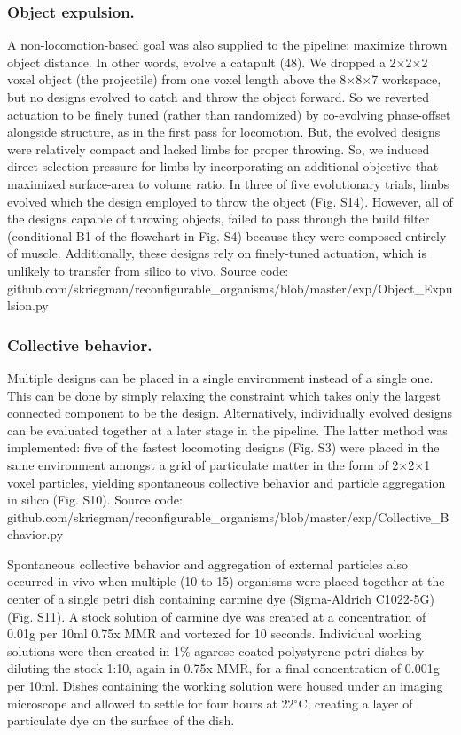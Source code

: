 \subsubsection*{Object expulsion.}

A non-locomotion-based goal was also supplied to the pipeline: maximize thrown object distance. In other words, evolve a catapult (48). We dropped a 2{$\times$}2{$\times$}2 voxel object (the projectile) from one voxel length above the 8{$\times$}8{$\times$}7 workspace, but no designs evolved to catch and throw the object forward. So we reverted actuation to be finely tuned (rather than randomized) by co-evolving phase-offset alongside structure, as in the first pass for locomotion. But, the evolved designs were relatively compact and lacked limbs for proper throwing. So, we induced direct selection pressure for limbs by incorporating an additional objective that maximized surface-area to volume ratio. In three of five evolutionary trials, limbs evolved which the design employed to throw the object (Fig. S14). However, all of the designs capable of throwing objects, failed to pass through the build filter (conditional B1 of the flowchart in Fig. S4) because they were composed entirely of muscle. Additionally, these designs rely on finely-tuned actuation, which is unlikely to transfer from silico to vivo. Source code: github.com/skriegman/reconfigurable\_organisms/blob/master/exp/Object\_Expulsion.py

\subsubsection*{Collective behavior.}

Multiple designs can be placed in a single environment instead of a single one. This can be done by simply relaxing the constraint which takes only the largest connected component to be the design. Alternatively, individually evolved designs can be evaluated together at a later stage in the pipeline. The latter method was implemented: five of the fastest locomoting designs (Fig. S3) were placed in the same environment amongst a grid of particulate matter in the form of 2{$\times$}2{$\times$}1 voxel particles, yielding spontaneous collective behavior and particle aggregation in silico (Fig. S10). Source code: github.com/skriegman/reconfigurable\_organisms/blob/master/exp/Collective\_Behavior.py

Spontaneous collective behavior and aggregation of external particles also occurred in vivo when multiple (10 to 15) organisms were placed together at the center of a single petri dish containing carmine dye (Sigma-Aldrich C1022-5G) (Fig. S11). A stock solution of carmine dye was created at a concentration of 0.01g per 10ml 0.75x MMR and vortexed for 10 seconds. Individual working solutions were then created in 1\% agarose coated polystyrene petri dishes by diluting the stock 1:10, again in 0.75x MMR, for a final concentration of 0.001g per 10ml. Dishes containing the working solution were housed under an imaging microscope and allowed to settle for four hours at 22{$^{\circ}$}C, creating a layer of particulate dye on the surface of the dish.

